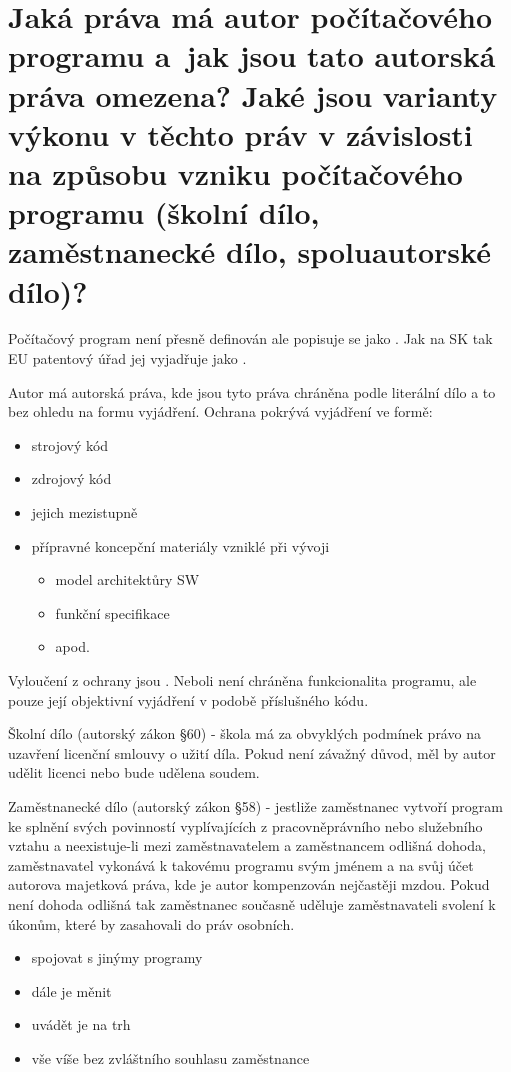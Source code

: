 \section{Jaká práva má autor počítačového programu a~jak jsou tato autorská práva omezena? Jaké jsou varianty výkonu v těchto práv v závislosti na způsobu vzniku počítačového programu (školní dílo, zaměstnanecké dílo, spoluautorské dílo)?}

Počítačový program není přesně definován ale popisuje se jako . Jak na SK tak EU patentový úřad jej vyjadřuje jako .

Autor má autorská práva, kde jsou tyto práva chráněna podle literální dílo a to bez ohledu na formu vyjádření.\vspace{0.5cm}\newline
Ochrana pokrývá vyjádření ve formě:
\begin{itemize}[noitemsep]
    \setlength\itemsep{0em}
    \item strojový kód
    \item zdrojový kód
    \item jejich mezistupně
    \item přípravné koncepční materiály vzniklé při vývoji
    \begin{itemize}[noitemsep]
        \setlength\itemsep{0em}
        \item model architektůry SW
        \item funkční specifikace
        \item apod.
    \end{itemize}
\end{itemize}
Vyloučení z ochrany jsou . Neboli není chráněna funkcionalita programu, ale pouze její objektivní vyjádření v podobě příslušného kódu.

Školní dílo (autorský zákon §60) - škola má za obvyklých podmínek právo na uzavření licenční smlouvy o užití díla. Pokud není závažný důvod, měl by autor udělit licenci nebo bude udělena soudem.

Zaměstnanecké dílo (autorský zákon §58) - jestliže zaměstnanec vytvoří program ke splnění svých povinností vyplívajících z pracovněprávního nebo služebního vztahu a neexistuje-li mezi zaměstnavatelem a zaměstnancem odlišná dohoda, zaměstnavatel vykonává k takovému programu svým jménem a na svůj účet autorova majetková práva, kde je autor kompenzován nejčastěji mzdou. Pokud není dohoda odlišná tak zaměstnanec současně uděluje zaměstnavateli svolení k úkonům, které by zasahovali do práv osobních.
\begin{itemize}[noitemsep]
    \setlength\itemsep{0em}
    \item spojovat s jinýmy programy
    \item dále je měnit 
    \item uvádět je na trh
    \item vše víše bez zvláštního souhlasu zaměstnance
\end{itemize}

